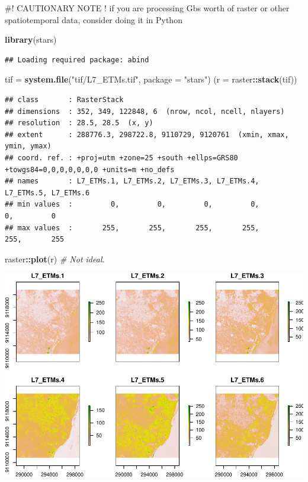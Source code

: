\documentclass[]{article}
\newenvironment{Shaded}{\begin{snugshade}}{\end{snugshade}}
\newcommand{\CommentTok}[1]{\textcolor[rgb]{0.56,0.35,0.01}{\textit{#1}}}
\newcommand{\DataTypeTok}[1]{\textcolor[rgb]{0.13,0.29,0.53}{#1}}
\newcommand{\KeywordTok}[1]{\textcolor[rgb]{0.13,0.29,0.53}{\textbf{#1}}}
\newcommand{\NormalTok}[1]{#1}
\newcommand{\OperatorTok}[1]{\textcolor[rgb]{0.81,0.36,0.00}{\textbf{#1}}}
\newcommand{\StringTok}[1]{\textcolor[rgb]{0.31,0.60,0.02}{#1}}
\begin{document}
\#! CAUTIONARY NOTE ! if you are processing Gbs worth of raster or other
spatiotemporal data, consider doing it in Python

\begin{Shaded}
\begin{Highlighting}[]
\KeywordTok{library}\NormalTok{(stars)}
\end{Highlighting}
\end{Shaded}

\begin{verbatim}
## Loading required package: abind
\end{verbatim}

\begin{Shaded}
\begin{Highlighting}[]
\NormalTok{tif =}\StringTok{ }\KeywordTok{system.file}\NormalTok{(}\StringTok{"tif/L7_ETMs.tif"}\NormalTok{, }\DataTypeTok{package =} \StringTok{"stars"}\NormalTok{)}
\NormalTok{(}\DataTypeTok{r =}\NormalTok{ raster}\OperatorTok{::}\KeywordTok{stack}\NormalTok{(tif))}
\end{Highlighting}
\end{Shaded}

\begin{verbatim}
## class       : RasterStack 
## dimensions  : 352, 349, 122848, 6  (nrow, ncol, ncell, nlayers)
## resolution  : 28.5, 28.5  (x, y)
## extent      : 288776.3, 298722.8, 9110729, 9120761  (xmin, xmax, ymin, ymax)
## coord. ref. : +proj=utm +zone=25 +south +ellps=GRS80 +towgs84=0,0,0,0,0,0,0 +units=m +no_defs 
## names       : L7_ETMs.1, L7_ETMs.2, L7_ETMs.3, L7_ETMs.4, L7_ETMs.5, L7_ETMs.6 
## min values  :         0,         0,         0,         0,         0,         0 
## max values  :       255,       255,       255,       255,       255,       255
\end{verbatim}

\begin{Shaded}
\begin{Highlighting}[]
\NormalTok{raster}\OperatorTok{::}\KeywordTok{plot}\NormalTok{(r) }\CommentTok{# Not ideal.}
\end{Highlighting}
\end{Shaded}

\includegraphics{R_tidyverse_for_geographers_files/figure-latex/unnamed-chunk-35-1.pdf}
\end{document}

